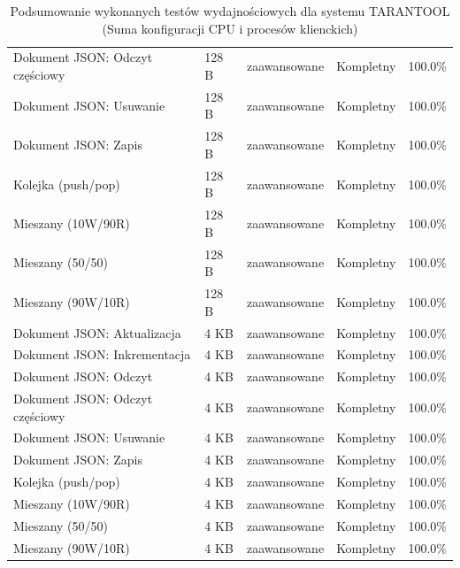 \begin{table}[ht]
{\begin{tabular}{lllcc}
Dokument JSON: Odczyt częściowy & 128 B & zaawansowane & Kompletny & 100.0\% \\
Dokument JSON: Usuwanie & 128 B & zaawansowane & Kompletny & 100.0\% \\
Dokument JSON: Zapis & 128 B & zaawansowane & Kompletny & 100.0\% \\
Kolejka (push/pop) & 128 B & zaawansowane & Kompletny & 100.0\% \\
Mieszany (10W/90R) & 128 B & zaawansowane & Kompletny & 100.0\% \\
Mieszany (50/50) & 128 B & zaawansowane & Kompletny & 100.0\% \\
Mieszany (90W/10R) & 128 B & zaawansowane & Kompletny & 100.0\% \\
Dokument JSON: Aktualizacja & 4 KB & zaawansowane & Kompletny & 100.0\% \\
Dokument JSON: Inkrementacja & 4 KB & zaawansowane & Kompletny & 100.0\% \\
Dokument JSON: Odczyt & 4 KB & zaawansowane & Kompletny & 100.0\% \\
Dokument JSON: Odczyt częściowy & 4 KB & zaawansowane & Kompletny & 100.0\% \\
Dokument JSON: Usuwanie & 4 KB & zaawansowane & Kompletny & 100.0\% \\
Dokument JSON: Zapis & 4 KB & zaawansowane & Kompletny & 100.0\% \\
Kolejka (push/pop) & 4 KB & zaawansowane & Kompletny & 100.0\% \\
Mieszany (10W/90R) & 4 KB & zaawansowane & Kompletny & 100.0\% \\
Mieszany (50/50) & 4 KB & zaawansowane & Kompletny & 100.0\% \\
Mieszany (90W/10R) & 4 KB & zaawansowane & Kompletny & 100.0\% \\
\bottomrule
\end{tabular}%
}
\caption{Podsumowanie wykonanych testów wydajnościowych dla systemu TARANTOOL (Suma konfiguracji CPU i procesów klienckich)}
\label{tab:executed_tests_tarantool}
\end{table}
